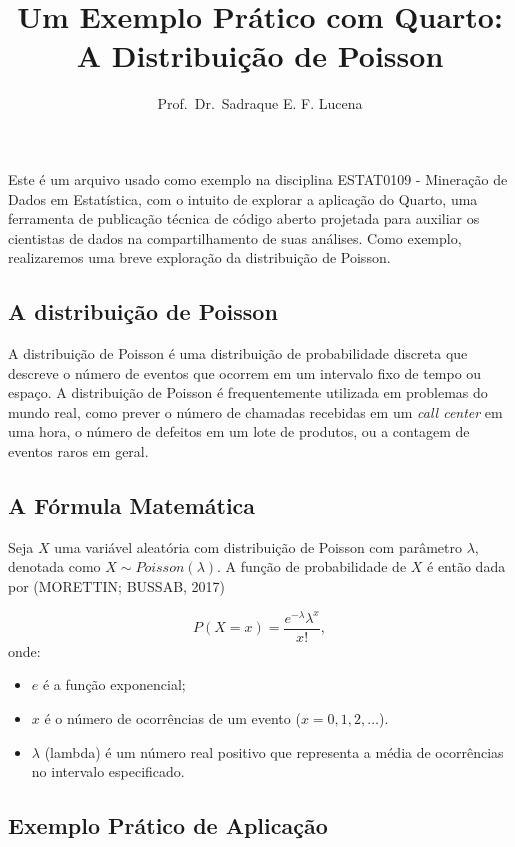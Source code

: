 \documentclass[
  portuguese,
  letterpaper,
  DIV=11,
  numbers=noendperiod]{scrartcl}
\title{Um Exemplo Prático com Quarto: A Distribuição de Poisson}
\author{Prof.~Dr.~Sadraque E. F. Lucena}
\date{}
\providecommand{\tightlist}{%
  \setlength{\itemsep}{0pt}\setlength{\parskip}{0pt}}
\begin{document}
\maketitle


Este é um arquivo usado como exemplo na disciplina ESTAT0109 - Mineração
de Dados em Estatística, com o intuito de explorar a aplicação do
Quarto, uma ferramenta de publicação técnica de código aberto projetada
para auxiliar os cientistas de dados na compartilhamento de suas
análises. Como exemplo, realizaremos uma breve exploração da
distribuição de Poisson.

\subsection{A distribuição de
Poisson}\label{a-distribuiuxe7uxe3o-de-poisson}

A distribuição de Poisson é uma distribuição de probabilidade discreta
que descreve o número de eventos que ocorrem em um intervalo fixo de
tempo ou espaço. A distribuição de Poisson é frequentemente utilizada em
problemas do mundo real, como prever o número de chamadas recebidas em
um \emph{call center} em uma hora, o número de defeitos em um lote de
produtos, ou a contagem de eventos raros em geral.

\subsection{A Fórmula Matemática}\label{a-fuxf3rmula-matemuxe1tica}

Seja \(X\) uma variável aleatória com distribuição de Poisson com
parâmetro \(\lambda\), denotada como \(X\sim Poisson(\lambda)\). A
função de probabilidade de \(X\) é então dada por (MORETTIN; BUSSAB,
2017)

\[
  P(X=x) = \frac{e^{-\lambda}\lambda^x}{x!},
\] onde:

\begin{itemize}
\tightlist
\item
  \(e\) é a função exponencial;
\item
  \(x\) é o número de ocorrências de um evento (\(x=0, 1, 2, \ldots\)).
\item
  \(\lambda\) (lambda) é um número real positivo que representa a média
  de ocorrências no intervalo especificado.
\end{itemize}

\subsection{Exemplo Prático de
Aplicação}\label{exemplo-pruxe1tico-de-aplicauxe7uxe3o}
\end{document}
